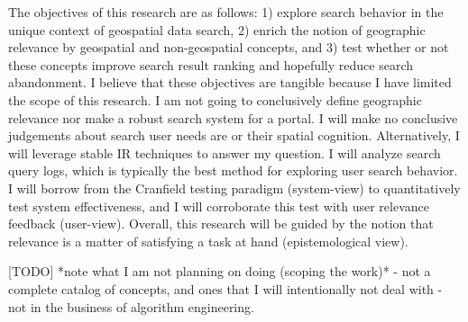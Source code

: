 The objectives of this research are as follows: 1) explore search behavior in the unique context of geospatial data search, 2) enrich the notion of geographic relevance by geospatial and non-geospatial concepts, and 3) test whether or not these concepts improve search result ranking and hopefully reduce search abandonment. I believe that these objectives are tangible because I have limited the scope of this research. I am not going to conclusively define geographic relevance nor make a robust search system for a portal. I will make no conclusive judgements about search user needs are or their spatial cognition. Alternatively, I will leverage stable IR techniques to answer my question. I will analyze search query logs, which is typically the best method for exploring user search behavior. I will borrow from the Cranfield testing paradigm (system-view) to quantitatively test system effectiveness, and I will corroborate this test with user relevance feedback (user-view). Overall, this research will be guided by the notion that relevance is a matter of satisfying a task at hand (epistemological view).

[TODO] *note what I am not planning on doing (scoping the work)*
- not a complete catalog of concepts, and ones that I will intentionally not deal with
- not in the business of algorithm engineering. 